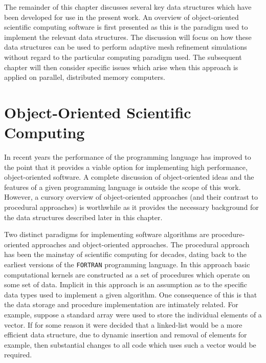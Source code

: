 The remainder of this chapter discusses several key data structures which have been developed for use in the present work. An overview of object-oriented scientific computing software is first presented as this is the paradigm used to implement the relevant data structures. The discussion will focus on how these data structures can be used to perform adaptive mesh refinement simulations without regard to the particular computing paradigm used.  The subsequent chapter will then consider specific issues which arise when this approach is applied on parallel, distributed memory computers.

\section{Object-Oriented Scientific Computing\label{sec:amr_oop}}
In recent years the performance of the \cpp{} programming language has improved to the point that it provides a viable option for implementing high performance, object-oriented software.  A complete discussion of object-oriented ideas and the features of a given programming language is outside the scope of this work. However, a cursory overview of object-oriented approaches (and their contrast to procedural approaches) is worthwhile as it provides the necessary background for the data structures described later in this chapter.

Two distinct paradigms for implementing software algorithms are procedure-oriented approaches and object-oriented approaches.  The procedural approach has been the mainstay of scientific computing for decades, dating back to the earliest versions of the \texttt{FORTRAN} programming language.  In this approach basic computational kernels are constructed as a set of procedures which operate on some set of data.  Implicit in this approach is an assumption as to the specific data types used to implement a given algorithm.  One consequence of this is that the data storage and procedure implementation are intimately related.  For example, suppose a standard array were used to store the individual elements of a vector.  If for some reason it were decided that a linked-list would be a more efficient data structure, due to dynamic insertion and removal of elements for example, then substantial changes to all code which uses such a vector would be required.

